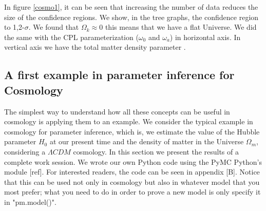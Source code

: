 \documentclass[onecolumn,           %
               showpacs,            %
               preprintnumbers,     %
               aps,                 %
               prl,          	    %
               letterpaper,             %
               superscriptaddress,      %
               nofootinbib,         %
               tightenlines,        %
               floats,floatfix      %
               ,usenatbib,
               ]{revtex4-1}
\begin{document}
In figure \ref{cosmo1}, it can be seen that increasing the number of data reduces the size of the confidence regions. We show, in the tree graphs, the confidence region to 1,2-$\sigma$. We found that $\Omega_k \approx 0$ this means that we have a flat Universe. We did the same with the CPL parameterization ($\omega_0$ and  $\omega_a$) in horizontal axis. In vertical axis we have the total matter density parameter 	.

\subsection{A first example in parameter inference for Cosmology}

The simplest way to understand how all these concepts can be useful in cosmology is applying them to an example. We consider the typical example in cosmology for parameter inference, which is, we estimate the value of the Hubble parameter $H_0$ at our present time and the density of matter in the Universe $\Omega_m$, considering a $\Lambda CDM$ cosmology. In this section we present the results of a complete work session. We wrote our own Python code using the PyMC Python's module [ref]. For interested readers, the code can be seen in appendix [B]. Notice that this can be used not only in cosmology but also in whatever model that you most prefer; what you need to do in order to prove a new model is only specify it in "pm.model()". 

%
\end{document}

